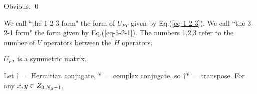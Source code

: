 \proof
Obvious.
\qed

We call ``the 1-2-3 form"
the form of $U_{FT}$ given
by Eq.(\ref{eq-1-2-3}).
We call ``the 3-2-1 form" the
form given by Eq.(\ref{eq-3-2-1}).
The
 numbers 1,2,3
refer to the
number of $V$ operators
between the $H$ operators.


\claim

$U_{FT}$ is a symmetric matrix.
\proof

Let $\dagger=$ Hermitian conjugate,
$*=$ complex conjugate, so $\dagger *=$ transpose.
For any $x,y\in Z_{0,{N_S}-1}$,

